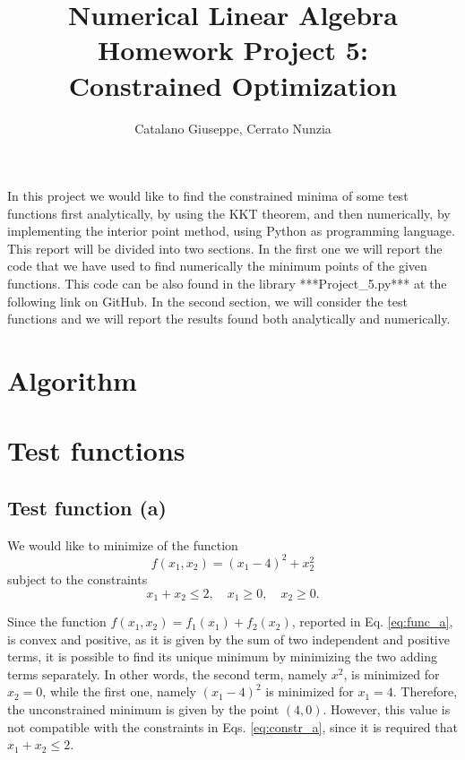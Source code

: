 \documentclass[a4paper,11pt]{article}
\begin{document}
	\author{Catalano Giuseppe, Cerrato Nunzia}
	\title{Numerical Linear Algebra Homework Project 5:\\Constrained Optimization}
	\date{}
	\maketitle

In this project we would like to find the constrained minima of some test functions first analytically, by using the KKT theorem, and then numerically, by implementing the interior point method, using Python as programming language. 
This report will be divided into two sections. In the first one we will report the code that we have used to find numerically the minimum points of the given functions. This code can be also found in the library ***Project\_5.py*** at the following link on GitHub. In the second section, we will consider the test functions and we will report the results found both analytically and numerically.

\section{Algorithm}


\section{Test functions}

\subsection{Test function (a)}

We would like to minimize of the function
\begin{equation}
	f(x_{1},x_{2}) = (x_{1}-4)^2 + x_{2}^{2}
	\label{eq:func_a}
\end{equation}
subject to the constraints
\begin{equation}
	x_{1} + x_{2} \le 2, \quad x_{1} \ge 0, \quad x_{2} \ge 0.
	\label{eq:constr_a}
\end{equation}

Since the function $f(x_{1},x_{2}) = f_{1}(x_{1}) + f_{2}(x_{2}) $, reported in Eq. \eqref{eq:func_a}, is convex and positive, as it is given by the sum of two independent and positive terms, it is possible to find its unique minimum by minimizing the two adding terms separately. In other words, the second term, namely $x^{2}$, is minimized for $x_{2}=0$, while the first one, namely $(x_{1}-4)^{2}$ is minimized for $x_{1}=4$. Therefore, the unconstrained minimum is given by the point $(4,0)$. However, this value is not compatible with the constraints in Eqs. \eqref{eq:constr_a}, since it is required that $x_{1} + x_{2} \le 2$.
	
	
	
	
	
	
	
	
	
	
	
	
	
	
\end{document}

